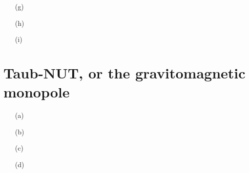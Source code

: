 \documentclass[10pt, a4paper]{article}
\begin{document}
{\begin{enumerate}
  \item[(g)]
  \item[(h)]
  \item[(i)] 

\end{enumerate}

\section{Taub-NUT, or the gravitomagnetic monopole}
\begin{enumerate}
  \item[(a)]
  \item[(b)]
  \item[(c)]
  \item[(d)]
\end{enumerate}

}

\makereferences


\end{document}
